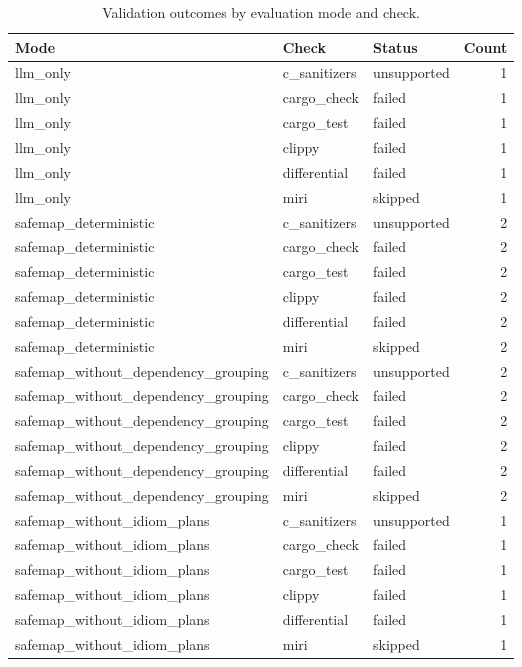 \begin{table}[t]
\centering
\caption{Validation outcomes by evaluation mode and check.}
\label{tab:safemap-validation-statuses}
\begin{tabular}{lllr}
\hline
Mode & Check & Status & Count \\
\hline
llm\_only & c\_sanitizers & unsupported & 1 \\
llm\_only & cargo\_check & failed & 1 \\
llm\_only & cargo\_test & failed & 1 \\
llm\_only & clippy & failed & 1 \\
llm\_only & differential & failed & 1 \\
llm\_only & miri & skipped & 1 \\
safemap\_deterministic & c\_sanitizers & unsupported & 2 \\
safemap\_deterministic & cargo\_check & failed & 2 \\
safemap\_deterministic & cargo\_test & failed & 2 \\
safemap\_deterministic & clippy & failed & 2 \\
safemap\_deterministic & differential & failed & 2 \\
safemap\_deterministic & miri & skipped & 2 \\
safemap\_without\_dependency\_grouping & c\_sanitizers & unsupported & 2 \\
safemap\_without\_dependency\_grouping & cargo\_check & failed & 2 \\
safemap\_without\_dependency\_grouping & cargo\_test & failed & 2 \\
safemap\_without\_dependency\_grouping & clippy & failed & 2 \\
safemap\_without\_dependency\_grouping & differential & failed & 2 \\
safemap\_without\_dependency\_grouping & miri & skipped & 2 \\
safemap\_without\_idiom\_plans & c\_sanitizers & unsupported & 1 \\
safemap\_without\_idiom\_plans & cargo\_check & failed & 1 \\
safemap\_without\_idiom\_plans & cargo\_test & failed & 1 \\
safemap\_without\_idiom\_plans & clippy & failed & 1 \\
safemap\_without\_idiom\_plans & differential & failed & 1 \\
safemap\_without\_idiom\_plans & miri & skipped & 1 \\

\end{tabular}
\end{table}
